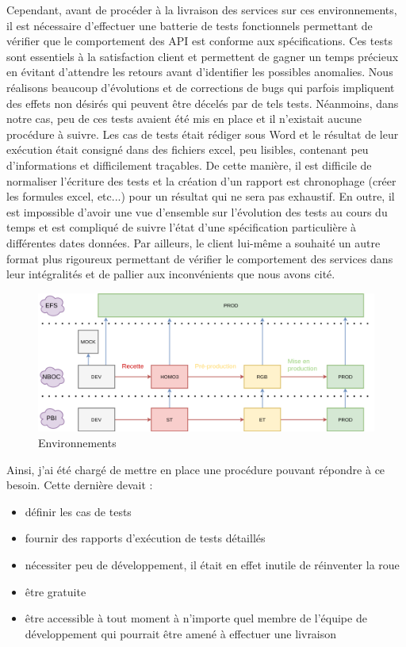 	Cependant, avant de procéder à la livraison des services sur ces environnements, il est nécessaire d'effectuer une batterie de tests fonctionnels permettant de vérifier que le comportement des API est conforme aux spécifications. Ces tests sont essentiels à la satisfaction client et permettent de gagner un temps précieux en évitant d'attendre les retours avant d'identifier les possibles anomalies. Nous réalisons beaucoup d'évolutions et de corrections de bugs qui parfois impliquent des effets non désirés qui peuvent être décelés par de tels tests. Néanmoins, dans notre cas, peu de ces tests avaient été mis en place et il n'existait aucune procédure à suivre. Les cas de tests était rédiger sous Word et le résultat de leur exécution était consigné dans des fichiers excel, peu lisibles, contenant peu d'informations et difficilement traçables. De cette manière, il est difficile de normaliser l'écriture des tests et la création d'un rapport est chronophage (créer les formules excel, etc...) pour un résultat qui ne sera pas exhaustif. En outre, il est impossible d'avoir une vue d'ensemble sur l'évolution des tests au cours du temps et est compliqué de suivre l'état d'une spécification particulière à différentes dates données. Par ailleurs, le client lui-même a souhaité un autre format plus rigoureux permettant de vérifier le comportement des services dans leur intégralités et de pallier aux inconvénients que nous avons cité. \\	
	
\begin{figure}[h!]
	\includegraphics[scale=0.5]{images/travailNeuflizeOBC/testsFonc/environnement.png}
	\center
	\caption{Environnements}
	\label{environnement}
\end{figure}

	Ainsi, j'ai été chargé de mettre en place une procédure pouvant répondre à ce besoin. Cette dernière devait :	
	\begin{itemize}
		\item définir les cas de tests
		\item fournir des rapports d'exécution de tests détaillés
		\item nécessiter peu de développement, il était en effet inutile de réinventer la roue
		\item être gratuite
		\item être accessible à tout moment à n'importe quel membre de l'équipe de développement qui pourrait être amené à effectuer une livraison \\
	\end{itemize}